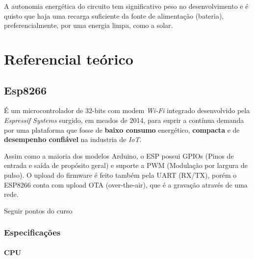 \documentclass[
12pt,				%
openany,			%
twoside,			%
a4paper,			%
english,			%
french,				%
spanish,			%
brazil,				%
]{abntex2}
\begin{document}
A autonomia energética do circuito tem significativo peso no desenvolvimento e é quisto que haja uma recarga suficiente da fonte de alimentação (bateria), preferencialmente, por uma energia limpa, como a solar.
\part{Referencial teórico}


%

\chapter{Esp8266}
É um microcontrolador de 32-bits com modem \textit{Wi-Fi} integrado desenvolvido pela \textit{Espressif Systems}
surgido, em meados de 2014, para suprir a contínua demanda por uma plataforma que fosse de \textsf{\textbf{baixo consumo}} 
energético, \textsf{\textbf{compacta}} e de \textsf{\textbf{desempenho confiável}} na industria de \textit{IoT}.

Assim como a maioria dos modelos Arduino, o ESP possui GPIOs (Pinos de entrada e saída de propósito geral)
e suporte a PWM (Modulação por largura de pulso). O upload do firmware é feito também pela UART (RX/TX), 
porém o ESP8266 conta com upload OTA (over-the-air), que é a gravação através de uma rede.  

Seguir pontos do curso
\section{Especificações}

\subsection{CPU}
\end{document}
